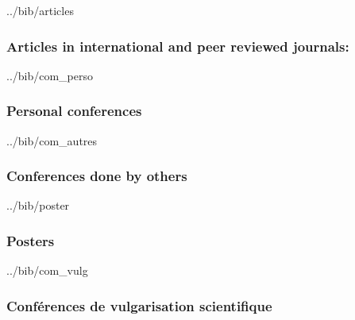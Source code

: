\documentclass[11pt]{artuppax}
\newcounter{subsec}[section]
\begin{document}
\begin{btSect}{../bib/articles}
    \subsubsection{Articles in international and peer reviewed journals:}
    \smallskip
    \btPrintAll
\end{btSect}

\begin{btSect}{../bib/com_perso}
    \subsubsection{Personal conferences}
    \smallskip
    \btPrintAll
\end{btSect}

\begin{btSect}{../bib/com_autres}
    \subsubsection{Conferences done by others}
    \smallskip
    \btPrintAll
\end{btSect}

\begin{btSect}{../bib/poster}
    \subsubsection{Posters}
    \smallskip
    \btPrintAll
\end{btSect}

\begin{btSect}{../bib/com_vulg}
    \subsubsection{Conférences de vulgarisation scientifique}
    \smallskip
    \btPrintAll
\end{btSect}


%
\end{document}
